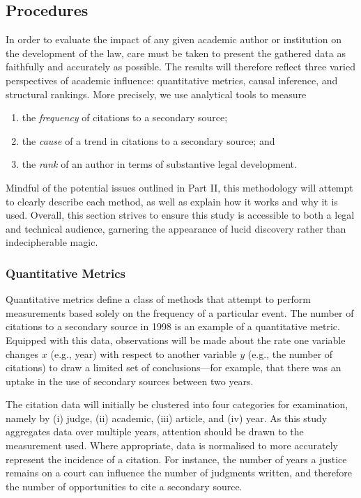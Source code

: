 \let\xn\xnote
\subsection{Procedures}


In order to evaluate the impact of any given academic author or institution on the development of the law, care must be taken to present the gathered data as faithfully and accurately as possible.\xn{4-0} The results will therefore reflect three varied perspectives of academic influence: quantitative metrics, causal inference, and structural rankings. More precisely, we use analytical tools to measure
\begin{enumerate}
    \item the \emph{frequency} of citations to a secondary source;
    \item the \emph{cause} of a trend in citations to a secondary source; and
    \item the \emph{rank} of an author in terms of substantive legal development.
\end{enumerate}
Mindful of the potential issues outlined in Part II, this methodology will attempt to clearly describe each method, as well as explain how it works and why it is used. Overall, this section strives to ensure this study is accessible to both a legal and technical audience, garnering the appearance of lucid discovery rather than indecipherable magic.

\subsubsection{Quantitative Metrics}
Quantitative metrics define a class of methods that attempt to perform measurements based solely on the frequency of a particular event.\xn{4-4} The number of citations to a secondary source in 1998 is an example of a quantitative metric. Equipped with this data, observations will be made about the rate one variable changes $x$ (e.g., year) with respect to another variable $y$ (e.g., the number of citations) to draw a limited set of conclusions\xn{4-5}---for example, that there was an uptake in the use of secondary sources between two years.

The citation data will initially be clustered into four categories for examination, namely by (i) judge, (ii) academic, (iii) article, and (iv) year. As this study aggregates data over multiple years, attention should be drawn to the measurement used. Where appropriate, data is normalised to more accurately represent the incidence of a citation. For instance, the number of years a justice remains on a court can influence the number of judgments written, and therefore the number of opportunities to cite a secondary source.

